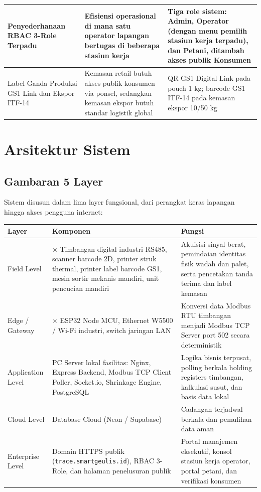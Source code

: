 \documentclass[12pt,a4paper]{article}
\begin{document}
\begin{longtable}{@{}>{\raggedright\arraybackslash}p{4.6cm}>{\raggedright\arraybackslash}p{6.2cm}>{\raggedright\arraybackslash}p{4.6cm}@{}}
\hline
Penyederhanaan RBAC 3-Role Terpadu & Efisiensi operasional di mana satu operator lapangan bertugas di beberapa stasiun kerja & Tiga role sistem: Admin, Operator (dengan menu pemilih stasiun kerja terpadu), dan Petani, ditambah akses publik Konsumen \\
\hline
Label Ganda Produksi GS1 Link dan Ekspor ITF-14 & Kemasan retail butuh akses publik konsumen via ponsel, sedangkan kemasan ekspor butuh standar logistik global & QR GS1 Digital Link pada pouch 1 kg; barcode GS1 ITF-14 pada kemasan ekspor 10/50 kg \\
\bottomrule
\end{longtable}

\section{Arsitektur Sistem}

\subsection{Gambaran 5 Layer}
Sistem disusun dalam lima layer fungsional, dari perangkat keras lapangan hingga akses pengguna internet:

\begin{longtable}{@{}>{\raggedright\arraybackslash}p{3.2cm}>{\raggedright\arraybackslash}p{7.0cm}>{\raggedright\arraybackslash}p{5.0cm}@{}}
\toprule
\textbf{Layer} & \textbf{Komponen} & \textbf{Fungsi} \\
\midrule
\endhead
Field Level & 3$\times$ Timbangan digital industri RS485, scanner barcode 2D, printer struk thermal, printer label barcode GS1, mesin sortir mekanis mandiri, unit pencucian mandiri & Akuisisi sinyal berat, pemindaian identitas fisik wadah dan palet, serta pencetakan tanda terima dan label kemasan \\
\hline
Edge / Gateway & 3$\times$ ESP32 Node MCU, Ethernet W5500 / Wi-Fi industri, switch jaringan LAN & Konversi data Modbus RTU timbangan menjadi Modbus TCP Server port 502 secara deterministik \\
\hline
Application Level & PC Server lokal fasilitas: Nginx, Express Backend, Modbus TCP Client Poller, Socket.io, Shrinkage Engine, PostgreSQL & Logika bisnis terpusat, polling berkala holding registers timbangan, kalkulasi susut, dan basis data lokal \\
\hline
Cloud Level & Database Cloud (Neon / Supabase) & Cadangan terjadwal berkala dan pemulihan data aman \\
\hline
Enterprise Level & Domain HTTPS publik (\texttt{trace.smartgeulis.id}), RBAC 3-Role, dan halaman penelusuran publik & Portal manajemen eksekutif, konsol stasiun kerja operator, portal petani, dan verifikasi konsumen \\
\bottomrule
\end{longtable}
\end{document}
